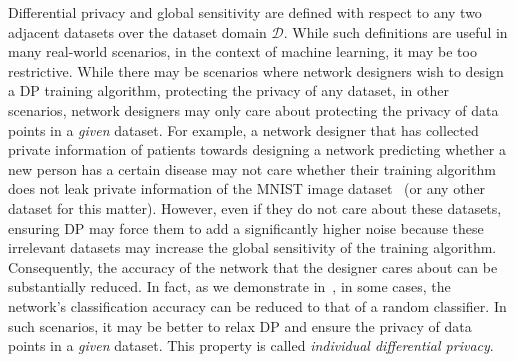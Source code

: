 Differential privacy and global sensitivity are defined with respect to any two adjacent datasets over the dataset domain $\mathcal{D}$. 
While such definitions are useful in many real-world scenarios, in the context of machine learning, it may be too restrictive. 
While there may be scenarios where network designers wish to design a DP training algorithm, protecting the privacy of any dataset, in other scenarios, network designers may only care about protecting the privacy of data points in a \emph{given} dataset. 
For example, a network designer that has collected private information of patients towards designing a network predicting whether a new person has a certain disease may not care whether their training algorithm does not leak private information of the MNIST image dataset~\citep{ref_41} (or any other dataset for this matter). However, even if they do not care about these datasets, ensuring DP may force them 
to add a significantly higher noise because these irrelevant datasets may increase the global sensitivity of the training algorithm. Consequently, the accuracy of the network that the designer cares about can be substantially reduced. In fact, as we demonstrate in~, in some cases, the network's classification accuracy can be reduced to that of a random classifier.
In such scenarios, it may be better to relax DP and ensure the privacy of data points in a \emph{given} dataset. This property is called \emph{individual differential privacy}.  
  


